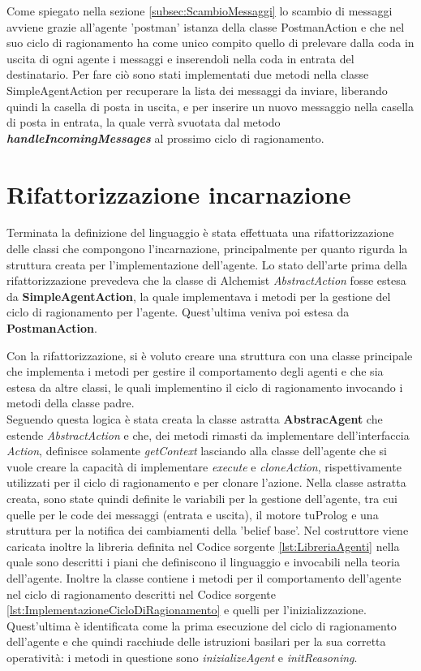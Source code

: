 \documentclass[12pt,a4paper,openright,twoside]{report}
\begin{document}
\bigskip

Come spiegato nella sezione \ref{subsec:ScambioMessaggi} lo scambio di messaggi avviene grazie all'agente 'postman' istanza della classe PostmanAction e che nel suo ciclo di ragionamento ha come unico compito quello di prelevare dalla coda in uscita di ogni agente i messaggi e inserendoli nella coda in entrata del destinatario. Per fare ci\`o sono stati implementati due metodi nella classe SimpleAgentAction per recuperare la lista dei messaggi da inviare, liberando quindi la casella di posta in uscita, e per inserire un nuovo messaggio nella casella di posta in entrata, la quale verr\`a svuotata dal metodo \textbf{\textit{handleIncomingMessages}} al prossimo ciclo di ragionamento.


\section{Rifattorizzazione incarnazione}
Terminata la definizione del linguaggio \`e stata effettuata una rifattorizzazione delle classi che compongono l'incarnazione, principalmente per quanto rigurda la struttura creata per l'implementazione dell'agente.
Lo stato dell'arte prima della rifattorizzazione prevedeva che la classe di Alchemist \textit{AbstractAction} fosse estesa da \textbf{SimpleAgentAction}, la quale implementava i metodi per la gestione del ciclo di ragionamento per l'agente. Quest'ultima veniva poi estesa da \textbf{PostmanAction}.

Con la rifattorizzazione, si \`e voluto creare una struttura con una classe principale che implementa i metodi per gestire il comportamento degli agenti e che sia estesa da altre classi, le quali implementino il ciclo di ragionamento invocando i metodi della classe padre.
\\
Seguendo questa logica \`e stata creata la classe astratta \textbf{AbstracAgent} che estende \textit{AbstractAction} e che, dei metodi rimasti da implementare dell'interfaccia \textit{Action}, definisce solamente \textit{getContext} lasciando alla classe dell'agente che si vuole creare la capacit\`a di implementare \textit{execute} e \textit{cloneAction}, rispettivamente utilizzati per il ciclo di ragionamento e per clonare l'azione.
Nella classe astratta creata, sono state quindi definite le variabili per la gestione dell'agente, tra cui quelle per le code dei messaggi (entrata e uscita), il motore tuProlog e una struttura per la notifica dei cambiamenti della 'belief base'. Nel costruttore viene caricata inoltre la libreria definita nel Codice sorgente \ref{lst:LibreriaAgenti} nella quale sono descritti i piani che definiscono il linguaggio e invocabili nella teoria dell'agente. Inoltre la classe contiene i metodi per il comportamento dell'agente nel ciclo di ragionamento descritti nel Codice sorgente \ref{lst:ImplementazioneCicloDiRagionamento} e quelli per l'inizializzazione. Quest'ultima è identificata come la prima esecuzione del ciclo di ragionamento dell'agente e che quindi racchiude delle istruzioni basilari per la sua corretta operativit\`a: i metodi in questione sono \textit{inizializeAgent} e \textit{initReasoning}.
\end{document}
